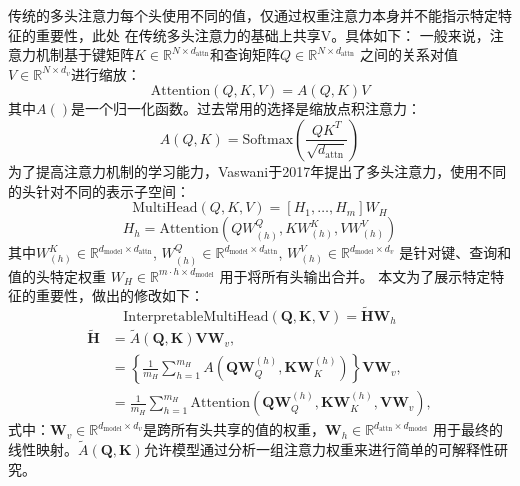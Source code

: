 传统的多头注意力每个头使用不同的值，仅通过权重注意力本身并不能指示特定特征的重要性，此处
在传统多头注意力的基础上共享V。具体如下：
一般来说，注意力机制基于键矩阵\( K \in \mathbb{R}^{N \times d_{\text{attn}}} \)和查询矩阵\( Q \in \mathbb{R}^{N \times d_{\text{attn}}} \)
之间的关系对值\( V \in \mathbb{R}^{N \times d_v} \)进行缩放：
\begin{equation}
    \text{Attention}(Q, K, V) = A(Q,K)V
\end{equation}
其中$A()$是一个归一化函数。过去常用的选择是缩放点积注意力：
\begin{equation}
    A(Q, K) = \text{Softmax}\left(\frac{QK^T}{\sqrt{d_{\text{attn}}}}\right)
\end{equation}
为了提高注意力机制的学习能力，Vaswani于2017年提出了多头注意力，使用不同的头针对不同的表示子空间：
\begin{equation}
    \text{MultiHead}(Q, K, V) = [H_1, \ldots, H_m]W_H
\end{equation}
\begin{equation}
    H_h = \text{Attention}(QW^Q_{(h)}, KW^K_{(h)}, VW^V_{(h)})
\end{equation}
其中\( W^K_{(h)} \in \mathbb{R}^{d_{\text{model}} \times d_{\text{attn}}} \), \( W^Q_{(h)} \in \mathbb{R}^{d_{\text{model}} \times d_{\text{attn}}} \), \( W^V_{(h)} \in \mathbb{R}^{d_{\text{model}} \times d_v} \) 
是针对键、查询和值的头特定权重 \( W_H \in \mathbb{R}^{m \cdot h \times d_{\text{model}}} \) 用于将所有头输出合并。
本文为了展示特定特征的重要性，做出的修改如下：
\begin{equation}
    \text{InterpretableMultiHead}(\mathbf{Q}, \mathbf{K}, \mathbf{V}) = \tilde{\mathbf{H}} \mathbf{W}_h
\end{equation}
\begin{equation}
    \begin{aligned}
        \mathbf{\tilde{H}} &= \tilde{A}(\mathbf{Q}, \mathbf{K}) \mathbf{V} \mathbf{W}_v, \\
        &= \left\{ \frac{1}{m_H} \sum_{h=1}^{m_H} A(\mathbf{Q} \mathbf{W}_Q^{(h)}, \mathbf{K} \mathbf{W}_K^{(h)}) \right\} \mathbf{V} \mathbf{W}_v, \\
        &= \frac{1}{m_H} \sum_{h=1}^{m_H} \text{Attention}(\mathbf{Q} \mathbf{W}_Q^{(h)}, \mathbf{K} \mathbf{W}_K^{(h)}, \mathbf{V} \mathbf{W}_v),
    \end{aligned}        
\end{equation}
式中：$\mathbf{W}_v \in \mathbb{R}^{d_{\text{model}} \times d_v}$是跨所有头共享的值的权重，$\mathbf{W}_h \in \mathbb{R}^{d_{\text{attn}} \times d_{\text{model}}}$
用于最终的线性映射。$\tilde{A}(\mathbf{Q}, \mathbf{K})$允许模型通过分析一组注意力权重来进行简单的可解释性研究。

